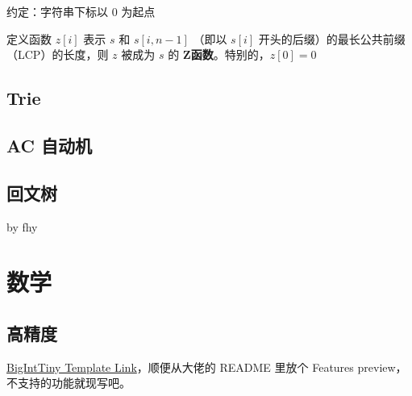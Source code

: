 \documentclass[12pt]{article}
\begin{document}
约定：字符串下标以 $0$ 为起点

定义函数 $z[i]$ 表示 $s$ 和 $s[i,n-1]$ （即以 $s[i]$ 开头的后缀）的最长公共前缀（LCP）的长度，则 $z$ 被成为 $s$ 的 \textbf{Z函数}。特别的，$z[0]=0$



\newpage

\subsection{Trie}



\newpage

\subsection{AC 自动机}



\newpage

\subsection{回文树}

by fhy



\newpage

{\centering\section{数学}}

\subsection{高精度}

\href{https://github.com/Baobaobear/MiniBigInteger/blob/main/bigint_tiny.h}{BigIntTiny Template Link}，顺便从大佬的 README 里放个 Features preview，不支持的功能就现写吧。
\end{document}
